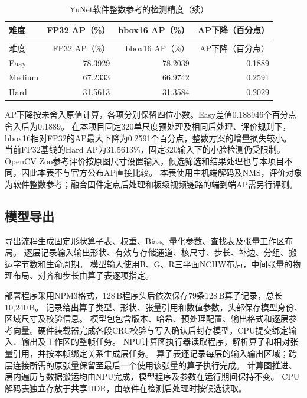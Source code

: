 \begin{reporttable}
\begin{longtable}{@{}lrrr@{}}
\caption{YuNet软件整数参考的检测精度}\\
\toprule
难度 & FP32 AP（\%） & bbox16 AP（\%） & AP下降（百分点） \\
\midrule
\endfirsthead
\caption[]{YuNet软件整数参考的检测精度（续）}\\
\toprule
难度 & FP32 AP（\%） & bbox16 AP（\%） & AP下降（百分点） \\
\midrule
\endhead
\bottomrule
\endfoot
Easy & 78.3929 & 78.2039 & 0.1889 \\
Medium & 67.2333 & 66.9742 & 0.2591 \\
Hard & 31.5613 & 31.3584 & 0.2029 \\
\end{longtable}
\end{reporttable}

AP下降按未舍入原值计算，各项分别保留四位小数。Easy差值0.188946个百分点舍入后为0.1889。
在本项目固定320单尺度预处理及相同后处理、评价规则下，bbox16相对FP32的AP最大下降为0.2591个百分点，整数方案的增量损失较小。
当前FP32基线的Hard AP为31.5613\%，固定320输入下的小脸检测仍受限制。
OpenCV Zoo参考评价按原图尺寸设置输入，候选筛选和结果处理也与本项目不同，因此本表不与官方公布AP直接比较\cite{opencv-zoo-yunet-2023mar}。
本表使用主机端解码及NMS，评价对象为软件整数参考；融合固件定点后处理和板级视频链路的端到端AP需另行评测。

\subsection{模型导出}

导出流程生成固定形状算子表、权重、Bias、量化参数、查找表及张量工作区布局。
逐层记录输入输出形状、有效与存储通道、核尺寸、步长、补边、分组、搬运字节数和生命周期。
模型输入使用B、G、R三平面NCHW布局，中间张量的物理布局、对齐和步长由算子表逐项指定。

部署程序采用NPM3格式，128\,B程序头后依次保存79条128\,B算子记录，总长10,240\,B。
记录给出算子类型、形状、张量引用和数值参数，头部保存模型身份、区域尺寸及校验信息。
模型包包含版本、哈希、预处理配置、输出格式和逐层参考向量。硬件装载器完成各段CRC校验与写入确认后封存模型，CPU提交绑定输入、输出及工作区的整帧任务。
NPU计算图执行器读取程序，解析算子和相对张量引用，并按本帧绑定关系生成层任务。
算子表还记录每层的输入输出区域；跨层连接所需的原张量保留至最后一个使用该张量的算子执行完成。
计算图推进、层内遍历与数据搬运均由NPU完成，模型程序及参数在运行期间保持不变。
CPU解码表独立存放于共享DDR，由软件在检测后处理时按候选读取。

